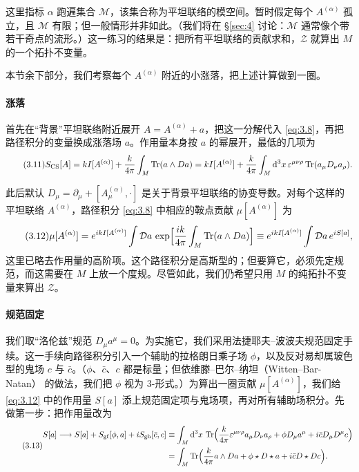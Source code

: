 这里指标 $\alpha$ 跑遍集合 $\mathcal{M}$，该集合称为平坦联络的模空间。暂时假定每个 $A^{(\alpha)}$ 孤立，且 $\mathcal{M}$ 有限；但一般情形并非如此。（我们将在 \S\ref{sec:4} 讨论：$\mathcal{M}$ 通常像个带若干奇点的流形。）这一练习的结果是：把所有平坦联络的贡献求和，$\mathcal{Z}$ 就算出 $M$ 的一个拓扑不变量。

本节余下部分，我们考察每个 $A^{(\alpha)}$ 附近的小涨落，把上述计算做到一圈。

\paragraph{涨落}
首先在“背景”平坦联络附近展开 $A=A^{(\alpha)}+a$，把这一分解代入 \eqref{eq:3.8}，再把路径积分的变量换成涨落场 $a$。作用量本身按 $a$ 的幂展开，最低的几项为
\begin{equation}\tag{3.11}\label{eq:3.11}
  S_{\mathrm{CS}}[A] = kI[A^{(\alpha)}] + \frac{k}{4\pi}\int_M\operatorname{Tr}(a\wedge Da)
  = kI[A^{(\alpha)}] + \frac{k}{4\pi}\int_M\mathrm{d}^3x\,\varepsilon^{\mu\nu\rho}\operatorname{Tr}(a_\mu D_\nu a_\rho).
\end{equation}

此后默认 $D_\mu=\partial_\mu+[A^{(\alpha)}_\mu,\cdot]$ 是关于背景平坦联络的协变导数。对每个这样的平坦联络 $A^{(\alpha)}$，路径积分 \eqref{eq:3.8} 中相应的鞍点贡献 $\mu[A^{(\alpha)}]$ 为
\begin{equation}\tag{3.12}\label{eq:3.12}
  \mu[A^{(\alpha)}] = e^{ikI[A^{(\alpha)}]}\int\mathcal{D}a\,\exp\Bigl[\frac{ik}{4\pi}\int_M\operatorname{Tr}(a\wedge Da)\Bigr]
  \equiv e^{ikI[A^{(\alpha)}]}\int\mathcal{D}a\,e^{iS[a]},
\end{equation}
这里已略去作用量的高阶项。这个路径积分是高斯型的；但要算它，必须先定规范，而这需要在 $M$ 上放一个度规。尽管如此，我们仍希望只用 $M$ 的纯拓扑不变量来算出 $\mathcal{Z}$。

\paragraph{规范固定}
我们取“洛伦兹”规范 $D_\mu a^\mu=0$。为实施它，我们采用法捷耶夫--波波夫规范固定手续。这一手续向路径积分引入一个辅助的拉格朗日乘子场 $\phi$，以及反对易却属玻色型的鬼场 $c$ 与 $\bar c$。（$\phi$、$\bar c$、$c$ 都是标量；但依维滕--巴尔--纳坦（Witten--Bar-Natan）\cite{barnatan1991} 的做法，我们把 $\phi$ 视为 3-形式。）为算出一圈贡献 $\mu[A^{(\alpha)}]$，我们给 \eqref{eq:3.12} 中的作用量 $S[a]$ 添上规范固定项与鬼场项，再对所有辅助场积分。先做第一步：把作用量改为
\begin{equation}\tag{3.13}\label{eq:3.13}
\begin{aligned}
  S[a] \longrightarrow S[a] + S_{\mathrm{gf}}[\phi,a] + iS_{\mathrm{gh}}[\bar c,c]
  &\equiv \int_M \mathrm{d}^3x\,\operatorname{Tr}\Bigl(\frac{k}{4\pi}\varepsilon^{\mu\nu\rho}a_\mu D_\nu a_\rho + \phi D_\mu a^\mu + i\bar c D_\mu D^\mu c\Bigr)\\
  &= \int_M \operatorname{Tr}\Bigl(\frac{k}{4\pi}a\wedge Da + \phi\star D\star a + i\bar c D\star D c\Bigr).
\end{aligned}
\end{equation}

